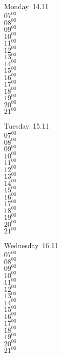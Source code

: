 \documentclass[11pt,a4paper]{book}\usepackage[]{graphicx}\usepackage[]{color}
\begin{document}
\begin{headerbox}
\end{headerbox}
\begin{weekdaybox}
  Monday~14.11\\
  { 
  \vfill
  $07^{00}$\\
$08^{00}$\\
$09^{00}$\\
$10^{00}$\\
$11^{00}$\\
$12^{00}$\\
$13^{00}$\\
$14^{00}$\\
$15^{00}$\\
$16^{00}$\\
$17^{00}$\\
$18^{00}$\\
$19^{00}$\\
$20^{00}$\\
$21^{00}$\\
  }
\end{weekdaybox}
\begin{weekdaybox}
  Tuesday~15.11\\
  { 
  \vfill
  $07^{00}$\\
$08^{00}$\\
$09^{00}$\\
$10^{00}$\\
$11^{00}$\\
$12^{00}$\\
$13^{00}$\\
$14^{00}$\\
$15^{00}$\\
$16^{00}$\\
$17^{00}$\\
$18^{00}$\\
$19^{00}$\\
$20^{00}$\\
$21^{00}$\\
  }
\end{weekdaybox}
\begin{weekdaybox}
  Wednesday~16.11\\
  { 
  \vfill
  $07^{00}$\\
$08^{00}$\\
$09^{00}$\\
$10^{00}$\\
$11^{00}$\\
$12^{00}$\\
$13^{00}$\\
$14^{00}$\\
$15^{00}$\\
$16^{00}$\\
$17^{00}$\\
$18^{00}$\\
$19^{00}$\\
$20^{00}$\\
$21^{00}$\\
  }
\end{weekdaybox}
\end{document}
